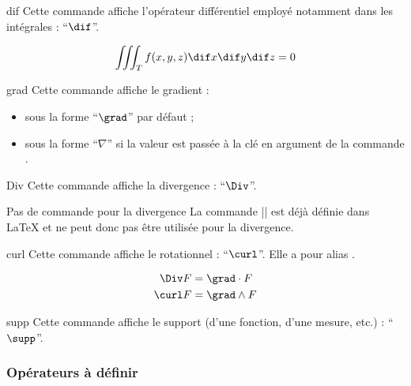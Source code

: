 \documentclass[english,nolocaltoc]{nwejmart}
\newtheorem[style=definition]{fait}
\newtheorem[title=expérience]{experience}
\newtheorem[title-plural=anneaux]{anneau}
\newtheorem[title=idéal,title-plural=idéaux]{ideal}
\begin{document}
\begin{docCommand}{dif}{}
  Cette commande affiche l'opérateur différentiel employé notamment dans les
  intégrales : \enquote{$\dif$}.
\begin{bodycode}
\begin{equation}
\iiint_T f(x,y,z)\dif x \dif y \dif z=0
\end{equation}
\end{bodycode}
\end{docCommand}

\begin{docCommand}{grad}{}
  Cette commande affiche le gradient :
  \begin{itemize}
  \item sous la forme \enquote{$\grad$} par défaut ;
  \item sous la forme \enquote{$\nabla$} si la valeur  est
    passée à la clé  en argument de la commande
    .
  \end{itemize}
\end{docCommand}

\begin{docCommand}{Div}{}
  Cette commande affiche la divergence : \enquote{$\Div$}.
  \begin{dbremark}{Pas de commande \protect{} pour la divergence}{}
    La commande |\div| est déjà définie dans \LaTeX{} et ne peut donc pas être
    utilisée pour la divergence.
  \end{dbremark}
\end{docCommand}

\begin{docCommand}{curl}{}
  Cette commande affiche le rotationnel :
  \enquote{$\curl$}. Elle a pour alias .
\end{docCommand}

\begin{bodycode}
\begin{align}
  \Div  F & = \grad \cdot  F \\
  \curl F & = \grad \wedge F
\end{align}
\end{bodycode}

\begin{docCommand}{supp}{}
  Cette commande affiche le support (d'une fonction, d'une mesure, etc.) :
  \enquote{$\supp$}.
\end{docCommand}

\subsubsection{Opérateurs à définir}
\end{document}
